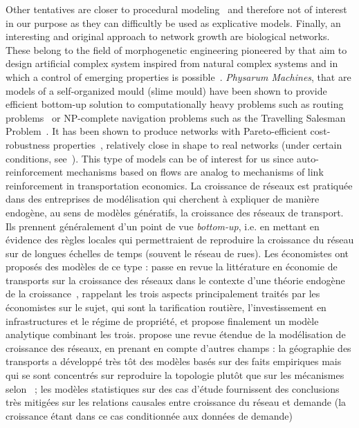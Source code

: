 {Other tentatives \cite{de2007netlogo,yamins2003growing} are closer to procedural modeling~\cite{lechner2004procedural,watson2008procedural} and therefore not of interest in our purpose as they can difficultly be used as explicative models. Finally, an interesting and original approach to network growth are biological networks. These belong to the field of morphogenetic engineering pioneered by  that aim to design artificial complex system inspired from natural complex systems and in which a control of emerging properties is possible~\cite{doursat2012morphogenetic}. \emph{Physarum Machines}, that are models of a self-organized mould (slime mould) have been shown to provide efficient bottom-up solution to computationally heavy problems such as routing problems~\cite{tero2006physarum} or NP-complete navigation problems such as the Travelling Salesman Problem~\cite{zhu2013amoeba}. It has been shown to produce networks with Pareto-efficient cost-robustness properties~\cite{tero2010rules}, relatively close in shape to real networks (under certain conditions, see~\cite{adamatzky2010road}). This type of models can be of interest for us since auto-reinforcement mechanisms based on flows are analog to mechanisms of link reinforcement in transportation economics.
}{
La croissance de réseaux est pratiquée dans des entreprises de modélisation qui cherchent à expliquer de manière endogène, au sens de modèles génératifs, la croissance des réseaux de transport. Ils prennent généralement d'un point de vue \emph{bottom-up}, i.e. en mettant en évidence des règles locales qui permettraient de reproduire la croissance du réseau sur de longues échelles de temps (souvent le réseau de rues). Les économistes ont proposés des modèles de ce type : \cite{zhang2007economics} passe en revue la littérature en économie de transports sur la croissance des réseaux dans le contexte d'une théorie endogène de la croissance~\cite{aghion1998endogenous}, rappelant les trois aspects principalement traités par les économistes sur le sujet, qui sont la tarification routière, l'investissement en infrastructures et le régime de propriété, et propose finalement un modèle analytique combinant les trois.
\cite{xie2009modeling} propose une revue étendue de la modélisation de croissance des réseaux, en prenant en compte d'autres champs : la géographie des transports a développé très tôt des modèles basés sur des faits empiriques mais qui se sont concentrés sur reproduire la topologie plutôt que sur les mécanismes selon~\cite{xie2009modeling} ; les modèles statistiques sur des cas d'étude fournissent des conclusions très mitigées sur les relations causales entre croissance du réseau et demande (la croissance étant dans ce cas conditionnée aux données de demande)
}
